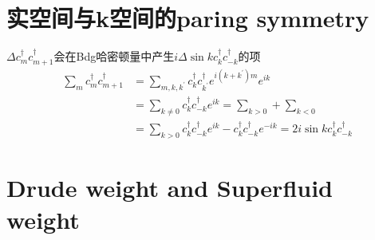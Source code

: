 \documentclass[10pt,openany]{book}
\theoremstyle{thmstyle} %
\theoremstyle{defstyle} %
\theoremstyle{prostyle} %
\begin{document}
\section{实空间与k空间的paring symmetry}
$\Delta c^\dagger_mc^\dagger_{m+1}$会在Bdg哈密顿量中产生$i \Delta \sin k c^\dagger_kc^\dagger_{-k}$的项
\begin{align*}
  \sum_m c^\dagger_mc^\dagger_{m+1} &= \sum_{m,k,k^\prime} c^\dagger_kc^\dagger_{k^\prime}e^{i(k+k^\prime)m}e^{ik}\\
   &= \sum_{k\ne0} c^\dagger_kc^\dagger_{-k} e^{ik} = \sum_{k>0} + \sum_{k<0} \\ 
   &= \sum_{k>0} c^\dagger_kc^\dagger_{-k} e^{ik} - c^\dagger_kc^\dagger_{-k} e^{-ik}=2i\sin k c^\dagger_kc^\dagger_{-k}
\end{align*}
\section{Drude weight and Superfluid weight}
\end{document}
